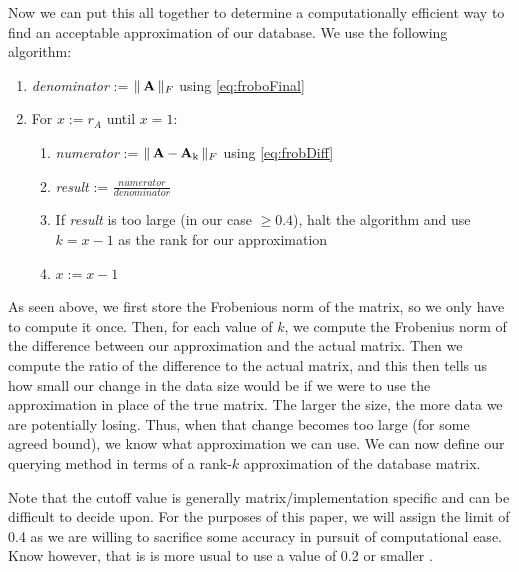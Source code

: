 Now we can put this all together to determine a computationally efficient way 
to find an acceptable approximation of our database. We use the following algorithm:
\begin{enumerate}
    \item \textit{denominator} := $\|\operatorname{\mathbf{A}}\|_F$ using \autoref{eq:froboFinal} %
    \item For $x:=r_A$ until $x=1$:
    \begin{enumerate}
        \item \textit{numerator} := $\|\operatorname{\mathbf{A}}-\operatorname{\mathbf{A}_k}\|_F$ using \autoref{eq:frobDiff}
        \item \textit{result} :=  $\frac{\textit{numerator}}{\textit{denominator}}$ 
        \item If \textit{result} is too large (in our case $\geq 0.4$), halt the algorithm and use $k=x-1$ as the rank for our approximation
        \item $x:=x-1$
    \end{enumerate}
\end{enumerate}

As seen above, we first store the Frobenious norm of the matrix, so we only have to compute it once.
Then, for each value of $k$, we compute the Frobenius norm of the difference between
our approximation and the actual matrix. Then we compute the ratio of the difference to the actual matrix, and this then tells us how small our change in the data size would be if we were to use the approximation in place of the true matrix. The larger the size, the more data we are potentially losing. Thus, when that change becomes too large (for some agreed bound), we know what approximation we can use. We can now define our querying method in terms of a rank-$k$ approximation of the
database matrix.

Note that the cutoff value is generally matrix/implementation specific and can be difficult to decide upon. For the purposes of this paper, we will assign the limit of 0.4 as we are willing to sacrifice some accuracy in pursuit of computational ease. Know however, that is is more usual to use a value of 0.2 or smaller \cite{berry99}.



